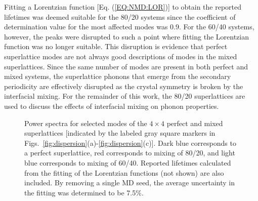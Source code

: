 \documentclass[aps,prb,preprint,preprintnumbers,amsmath,amssymb,floatfix,superscriptaddress]{revtex4}
\begin{document}
Fitting a Lorentzian function [Eq. (\ref{EQ:NMD:LOR})] to obtain the reported lifetimes was deemed suitable for the 80/20 systems since the coefficient of determination value \cite{Cowpe20081066} for the most affected modes was 0.9. For the 60/40 systems, however, the peaks were disrupted to such a point where fitting the Lorentzian function was no longer suitable. This disruption is evidence that perfect superlattice modes are not always good descriptions of modes in the mixed superlattices. Since the same number of modes are present in both perfect and mixed systems, the superlattice phonons that emerge from the secondary periodicity are effectively disrupted as the crystal symmetry is broken by the interfacial mixing. For the remainder of this work, the 80/20 superlattices are used to discuss the effects of interfacial mixing on phonon properties.
\renewcommand{\topfraction}{1.0}
\begin{figure*}%
\begin{center}
\renewcommand{\figure}{Fig.}
\caption{Power spectra for selected modes of the $4\times 4$ perfect and mixed superlattices [indicated by the labeled gray square markers in Figs.~\ref{fig:dispersion}(a)-\ref{fig:dispersion}(c)]. Dark blue corresponds to a perfect superlattice, red corresponds to mixing of 80/20, and light blue corresponds to mixing of 60/40. Reported lifetimes calculated from the fitting of the Lorentzian functions (not shown) are also included. By removing a single MD seed, the average uncertainty in the fitting was determined to be 7.5\%.}
\label{fig:sed}
\end{center}
\end{figure*}

\end{document}
